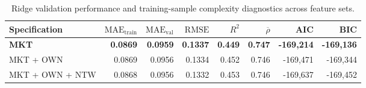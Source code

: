 \begin{table}[!htbp]
\centering
\footnotesize
\setlength{\tabcolsep}{4pt}
\caption{Ridge validation performance and training-sample complexity diagnostics across feature sets.}
\label{tab:ridge-feature-set-validation}
\begin{tabular}{lrrrrrrr}
\toprule
Specification & $\mathrm{MAE}_{\mathrm{train}}$ & $\mathrm{MAE}_{\mathrm{val}}$ & $\mathrm{RMSE}$ & $R^2$ & $\overline{\rho}$ & AIC & BIC \\
\midrule
\textbf{MKT} & \textbf{0.0869} & \textbf{0.0959} & \textbf{0.1337} & \textbf{0.449} & \textbf{0.747} & \textbf{-169,214} & \textbf{-169,136} \\
MKT + OWN & 0.0869 & 0.0956 & 0.1334 & 0.452 & 0.746 & -169,471 & -169,344 \\
MKT + OWN + NTW & 0.0868 & 0.0956 & 0.1332 & 0.453 & 0.746 & -169,637 & -169,452 \\
\bottomrule
\end{tabular}
\end{table}
